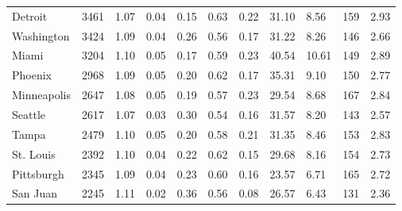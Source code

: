 \documentclass[Afour,sageh,times]{sagej}
\begin{document}
\begin{landscape}
\begin{table}
\begin{tabular}{p{2.5cm} p{1.5cm} p{1.5cm} p{1.5cm} p{1.55cm} p{1.5cm} p{1.5cm} p{1.5cm} p{1.5cm} p{1.5cm} p{1.5cm}}
Detroit              & 3461          & 1.07         & 0.04                       & 0.15           & 0.63        & 0.22        & 31.10                 & 8.56                  & 159                   & 2.93             \\
Washington           & 3424          & 1.09         & 0.04                       & 0.26           & 0.56        & 0.17        & 31.22                 & 8.26                  & 146                   & 2.66             \\
Miami                & 3204          & 1.10         & 0.05                       & 0.17           & 0.59        & 0.23        & 40.54                 & 10.61                 & 149                   & 2.89             \\
Phoenix              & 2968          & 1.09         & 0.05                       & 0.20           & 0.62        & 0.17        & 35.31                 & 9.10                  & 150                   & 2.77             \\
Minneapolis          & 2647          & 1.08         & 0.05                       & 0.19           & 0.57        & 0.23        & 29.54                 & 8.68                  & 167                   & 2.84             \\
Seattle              & 2617          & 1.07         & 0.03                       & 0.30           & 0.54        & 0.16        & 31.57                 & 8.20                  & 143                   & 2.57             \\
Tampa                & 2479          & 1.10         & 0.05                       & 0.20           & 0.58        & 0.21        & 31.35                 & 8.46                  & 153                   & 2.83             \\
St. Louis            & 2392          & 1.10         & 0.04                       & 0.22           & 0.62        & 0.15        & 29.68                 & 8.16                  & 154                   & 2.73             \\
Pittsburgh           & 2345          & 1.09         & 0.04                       & 0.23           & 0.60        & 0.16        & 23.57                 & 6.71                  & 165                   & 2.72             \\
San Juan             & 2245          & 1.11         & 0.02                       & 0.36           & 0.56        & 0.08        & 26.57                 & 6.43                  & 131                   & 2.36             \\

\end{tabular}
\end{table}
\end{landscape}
\end{document}
